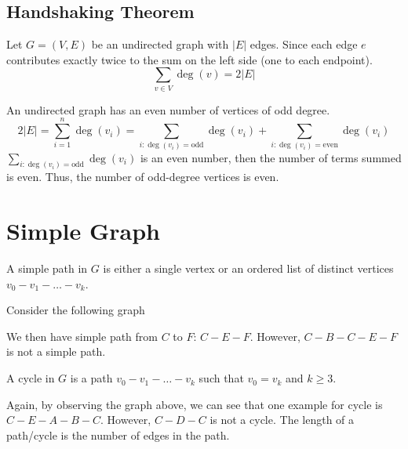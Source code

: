 \subsection{Handshaking Theorem}
\begin{theorem}
  Let \(G = (V, E)\) be an undirected graph with \(\vert E \vert\) edges. Since each edge \(e\) contributes exactly twice to the sum on the left side (one to each endpoint).
  \[
    \sum_{v \in V} \deg(v) = 2\vert E \vert
  \]
\end{theorem}

\begin{corollary}
  An undirected graph has an even number of vertices of odd degree.
  \[
    2\vert E \vert = \sum_{i = 1}^n \deg(v_i) = \sum_{i:\deg(v_i) = \text{odd}} \deg(v_i) + \sum_{i:\deg(v_i) = \text{even}} \deg(v_i)
  \]
  \(\sum_{i:\deg(v_i) = \text{odd}} \deg(v_i) \) is an even number, then the number of terms summed is even. Thus, the number of odd-degree vertices is even.
\end{corollary}

\newpage
\section{Simple Graph}

\begin{definition}
  A simple path in \(G\) is either a single vertex or an ordered list of distinct vertices \(v_0 - v_1 - \dots - v_k\).
\end{definition}
Consider the following graph
\begin{figure}[H]
  \centering
\end{figure}
We then have simple path from \(C\) to \(F\): \(C - E - F\). However, \(C - B - C - E - F\) is not a simple path. 

\begin{definition}[Cycles]
  A cycle in \(G\) is a path \(v_0 - v_1 - \dots - v_k\) such that \(v_0 = v_k\) and \(k \geq 3\). 
\end{definition}
Again, by observing the graph above, we can see that one example for cycle is \(C - E - A - B - C\). However, \(C - D - C\) is not a cycle. 
The length of a path/cycle is the number of edges in the path. 


